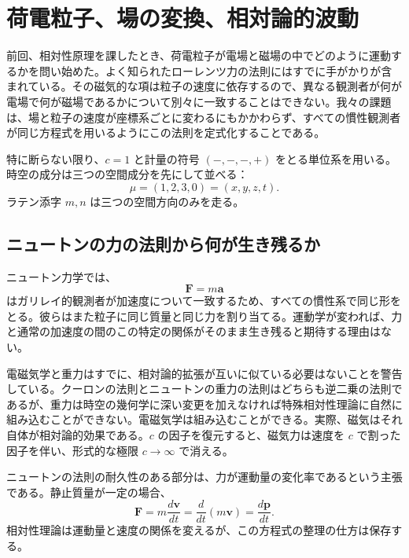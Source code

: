 \chapter{荷電粒子、場の変換、相対論的波動}

前回、相対性原理を課したとき、荷電粒子が電場と磁場の中でどのように運動するかを問い始めた。よく知られたローレンツ力の法則にはすでに手がかりが含まれている。その磁気的な項は粒子の速度に依存するので、異なる観測者が何が電場で何が磁場であるかについて別々に一致することはできない。我々の課題は、場と粒子の速度が座標系ごとに変わるにもかかわらず、すべての慣性観測者が同じ方程式を用いるようにこの法則を定式化することである。

特に断らない限り、\(c=1\) と計量の符号 \((-,-,-,+)\) をとる単位系を用いる。時空の成分は三つの空間成分を先にして並べる：
\begin{equation}
  \mu=(1,2,3,0)=(x,y,z,t).
\end{equation}
ラテン添字 \(m,n\) は三つの空間方向のみを走る。

\section{ニュートンの力の法則から何が生き残るか}

ニュートン力学では、
\begin{equation}
  \boldsymbol F=m\boldsymbol a
\end{equation}
はガリレイ的観測者が加速度について一致するため、すべての慣性系で同じ形をとる。彼らはまた粒子に同じ質量と同じ力を割り当てる。運動学が変われば、力と通常の加速度の間のこの特定の関係がそのまま生き残ると期待する理由はない。

電磁気学と重力はすでに、相対論的拡張が互いに似ている必要はないことを警告している。クーロンの法則とニュートンの重力の法則はどちらも逆二乗の法則であるが、重力は時空の幾何学に深い変更を加えなければ特殊相対性理論に自然に組み込むことができない。電磁気学は組み込むことができる。実際、磁気はそれ自体が相対論的効果である。\(c\) の因子を復元すると、磁気力は速度を \(c\) で割った因子を伴い、形式的な極限 \(c\to\infty\) で消える。

ニュートンの法則の耐久性のある部分は、力が運動量の変化率であるという主張である。静止質量が一定の場合、
\begin{equation}
  \boldsymbol F
  =m\frac{d\boldsymbol v}{dt}
  =\frac{d}{dt}(m\boldsymbol v)
  =\frac{d\boldsymbol p}{dt}.
\end{equation}
相対性理論は運動量と速度の関係を変えるが、この方程式の整理の仕方は保存する。

